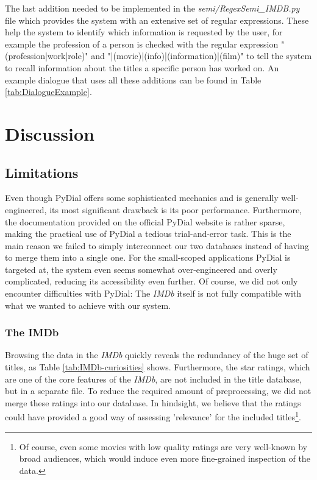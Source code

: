 \documentclass[11pt,a4paper]{article}
\begin{document}
The last addition needed to be implemented in the \emph{semi/RegexSemi\_IMDB.py} file which provides the system with an extensive set of regular expressions. These help the system to identify which information is requested by the user, for example the profession of a person is checked with the regular expression "(profession|work|role)" and "|(movie)|(info)|(information)|(film)" to tell the system to recall information about the titles a specific person has worked on. An example dialogue that uses all these additions can be found in Table \ref{tab:DialogueExample}.

\section{Discussion}
	\subsection{Limitations}
	\label{sec:limitations}
	Even though PyDial offers some sophisticated mechanics and is generally well-engineered, its most significant drawback is its poor performance. Furthermore, the documentation provided on the official PyDial website is rather sparse, making the practical use of PyDial a tedious trial-and-error task. This is the main reason we failed to simply interconnect our two databases instead of having to merge them into a single one. For the small-scoped applications PyDial is targeted at, the system even seems somewhat over-engineered and overly complicated, reducing its accessibility even further. Of course, we did not only encounter difficulties with PyDial: The \textit{IMDb} itself is not fully compatible with what we wanted to achieve with our system.
	\subsubsection{The IMDb}
	\label{sec:limitations-IMDb}	
	Browsing the data in the \textit{IMDb} quickly reveals the redundancy of the huge set of titles, as Table \ref{tab:IMDb-curiosities} shows.
Furthermore, the star ratings, which are one of the core features of the \textit{IMDb}, are not included in the title database, but in a separate file. To reduce the required amount of preprocessing, we did not merge these ratings into our database. In hindsight, we believe that the ratings could have provided a good way of assessing 'relevance' for the included titles\footnote{Of course, even some movies with low quality ratings are very well-known by broad audiences, which would induce even more fine-grained inspection of the data.}. 
	
\end{document}
